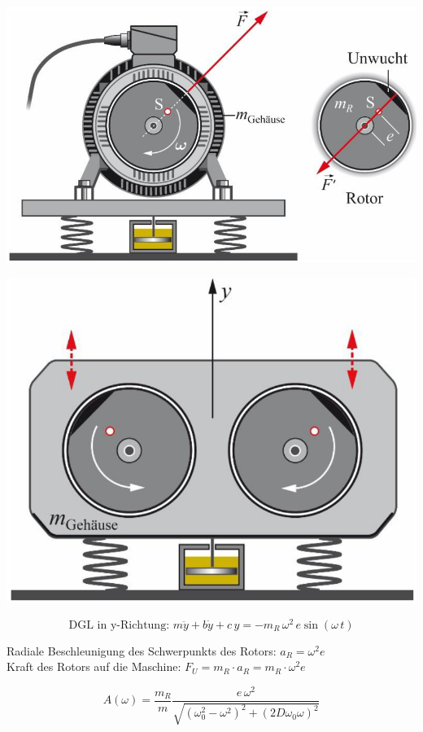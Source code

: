 \begin{minipage}{0.52\linewidth}
\includegraphics[width=0.9\linewidth]{Bilder/Wellen-Optik/unwucht} \\
\end{minipage}
\hfill
\begin{minipage}{0.44\linewidth}
\includegraphics[width=0.89\linewidth]{Bilder/Wellen-Optik/unwucht_gehause} \\
\end{minipage}

$$ \boxed{ \text{DGL in y-Richtung: } m \ddot{y} + b \dot{y} + c \, y = -m_R \, \omega^2 \, e \sin(\omega \, t) }  $$

Radiale Beschleunigung des Schwerpunkts des Rotors: $a_R = \omega^2 e$ \\

Kraft des Rotors auf die Maschine: $\boxed{ F_U = m_R \cdot a_R = m_R \cdot \omega^2 e } $ 

$$ A(\omega) = \frac{m_R}{m} \frac{e \, \omega^2}{\sqrt{(\omega_0^2 -\omega^2)^2 + (2D \omega_0 \omega)^2}}  $$ 


